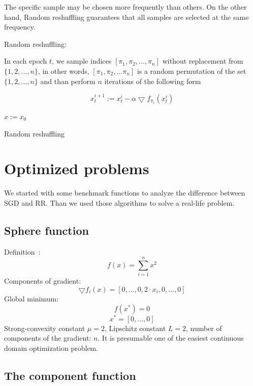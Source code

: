 \documentclass[10pt,conference,compsocconf]{IEEEtran}
\begin{document}
\noindent The specific sample may be chosen more frequently than others. On the
other hand, Random reshuffling guarantees that all samples are selected at
the same frequency.

\medskip

\noindent Random reshuffling:

\noindent In each epoch $t$, we sample indices $[\pi_1, \pi_2,..., \pi_n]$
without replacement from $\{1, 2,..., n\}$, in other words,
$[\pi_1, \pi_2,...\pi_n]$ is a random permutation of the
set $\{1, 2,..., n\}$ and than perform $n$ iterations of the following
form

$$x_t^{i+1} := x_t^i - \alpha \bigtriangledown f_{\pi_i}(x_t^i)$$

\begin{algorithm}
\SetAlgoLined

  $x:= x_0$ \\
 
 \caption{Random reshuffling}
\end{algorithm}



\section{Optimized problems}

We started with some benchmark functions to analyze the difference between
SGD and RR. Than we used those algorithms to solve a real-life problem.

\subsection{Sphere function}

\noindent Definition~\cite{SPHERE}:
$$f(x) = \sum_{i=1}^n x^2$$
Components of gradient:
$$\bigtriangledown f_i(x) = [0,...,0,2\cdot x_i,0,...,0]$$
Global minimum:
$$f(x^*) = 0$$
$$x^* = [0,...,0]$$
Strong-convexity constant $\mu = 2$, Lipschitz constant \mbox{$L=2$},
number of components of the gradient: $n$. It is presumable one of
the easiest continuous domain optimization problem.

\subsection{The component function}
\end{document}
